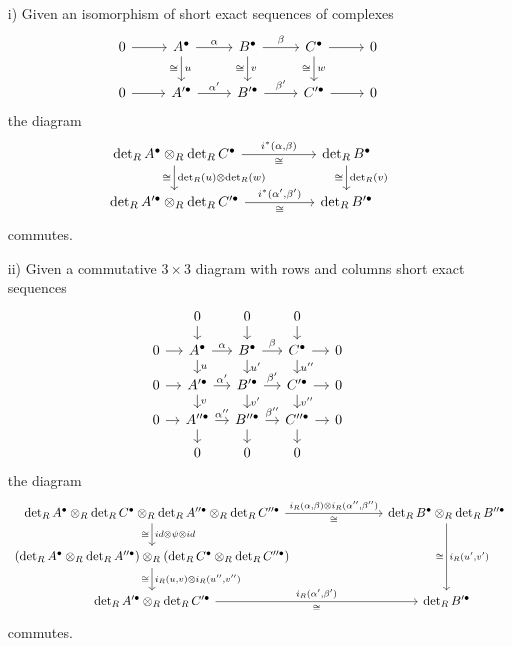 \documentclass{article}
\numberwithin{equation}{section}
\begin{document}
\begin{appendices}
\begin{theorem}
  \begin{enumerate}
  \item[i)] Given an isomorphism of short exact sequences of complexes
    \[ \begin{tikzcd}
        0 \ar{r} & A^\bullet \ar{r}{\alpha}\ar{d}{u}[swap]{\cong} & B^\bullet \ar{r}{\beta}\ar{d}{v}[swap]{\cong} & C^\bullet \ar{r}\ar{d}{w}[swap]{\cong} & 0 \\
        0 \ar{r} & A'^\bullet \ar{r}{\alpha'} & B'^\bullet \ar{r}{\beta'} & C'^\bullet \ar{r} & 0
      \end{tikzcd} \]
    the diagram
    \[ \begin{tikzcd}[column sep=5em]
        \det_R A^\bullet \otimes_R \det_R C^\bullet \ar{r}{i^* (\alpha,\beta)}[swap]{\cong}\ar{d}{\det_R (u) \otimes \det_R (w)}[swap]{\cong} & \det_R B^\bullet\ar{d}{\det_R (v)}[swap]{\cong} \\
        \det_R A'^\bullet \otimes_R \det_R C'^\bullet \ar{r}{i^* (\alpha',\beta')}[swap]{\cong} & \det_R B'^\bullet
      \end{tikzcd} \]
    commutes.

  \item[ii)] Given a commutative $3\times 3$ diagram with rows and columns short
    exact sequences
    \[ \begin{tikzcd}[row sep=1em, column sep=1em]
        & 0\ar{d} & 0\ar{d} & 0\ar{d} \\
        0\ar{r} & A^\bullet\ar{r}{\alpha}\ar{d}{u} & B^\bullet\ar{r}{\beta}\ar{d}{u'} & C^\bullet\ar{r}\ar{d}{u''} & 0 \\
        0\ar{r} & A'^\bullet\ar{r}{\alpha'}\ar{d}{v} & B'^\bullet\ar{r}{\beta'}\ar{d}{v'} & C'^\bullet\ar{r}\ar{d}{v''} & 0 \\
        0\ar{r} & A''^\bullet\ar{r}{\alpha''}\ar{d} & B''^\bullet\ar{r}{\beta''}\ar{d} & C''^\bullet\ar{r}\ar{d} & 0 \\
        & 0 & 0 & 0
      \end{tikzcd} \]
    the diagram
    \[ \begin{tikzcd}[column sep=7em]
        \det_R A^\bullet \otimes_R \det_R C^\bullet \otimes_R \det_R A''^\bullet \otimes_R \det_R C''^\bullet \ar{r}{i_R (\alpha,\beta) \otimes i_R (\alpha'',\beta'')}[swap]{\cong}\ar{d}{id \otimes \psi \otimes id}[swap]{\cong} & \det_R B^\bullet \otimes_R \det_R B''^\bullet\ar{dd}{i_R (u',v')}[swap]{\cong} \\
        (\det_R A^\bullet \otimes_R \det_R A''^\bullet) \otimes_R (\det_R C^\bullet \otimes_R \det_R C''^\bullet)\ar{d}[swap]{\cong}{i_R (u,v) \otimes i_R (u'',v'')} \\
        \det_R A'^\bullet \otimes_R \det_R C'^\bullet \ar{r}{i_R (\alpha',\beta')}[swap]{\cong} & \det_R B'^\bullet
      \end{tikzcd} \]
    commutes.


\end{enumerate}
\end{theorem}
\end{appendices}
\end{document}
